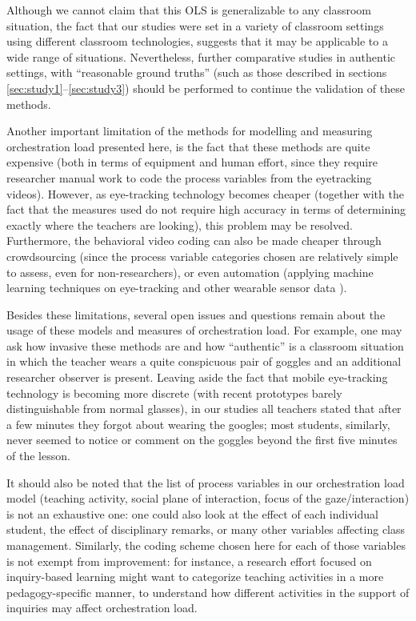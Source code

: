 \documentclass[10pt,journal,compsoc]{IEEEtran}
\begin{document}
Although we cannot claim that this OLS is generalizable to any classroom situation, the fact that our studies were set in a variety of classroom settings using different classroom technologies, suggests that it may be applicable to a wide range of situations. Nevertheless, further comparative studies in authentic settings, with ``reasonable ground truths'' (such as those described in sections \ref{sec:study1}--\ref{sec:study3}) should be performed to continue the validation of these methods.

Another important limitation of the methods for modelling and measuring orchestration load presented here, is the fact that these methods are quite expensive (both in terms of equipment and human effort, since they require researcher manual work to code the process variables from the eyetracking videos). However, as eye-tracking technology becomes cheaper (together with the fact that the measures used do not require high accuracy in terms of determining exactly where the teachers are looking), this problem may be resolved. Furthermore, the behavioral video coding can also be made cheaper through crowdsourcing (since the process variable categories chosen are relatively simple to assess, even for non-researchers), or even automation (applying machine learning techniques on eye-tracking and other wearable sensor data \cite{prieto2016teaching}).

Besides these limitations, several open issues and questions remain about the usage of these models and measures of orchestration load. For example, one may ask how invasive these methods are and how ``authentic'' is a classroom situation in which the teacher wears a quite conspicuous pair of goggles and an additional researcher observer is present. Leaving aside the fact that mobile eye-tracking technology is becoming more discrete (with recent prototypes barely distinguishable from normal glasses), in our studies all teachers stated that after a few minutes they forgot about wearing the googles; most students, similarly, never seemed to notice or comment on the goggles beyond the first five minutes of the lesson.

It should also be noted that the list of process variables in our orchestration load model (teaching activity, social plane of interaction, focus of the gaze/interaction) is not an exhaustive one: one could also look at the effect of each individual student, the effect of disciplinary remarks, or many other variables affecting class management. Similarly, the coding scheme chosen here for each of those variables is not exempt from improvement: for instance, a research effort focused on inquiry-based learning might want to categorize teaching activities in a more pedagogy-specific manner, to understand how different activities in the support of inquiries may affect orchestration load.
\end{document}
